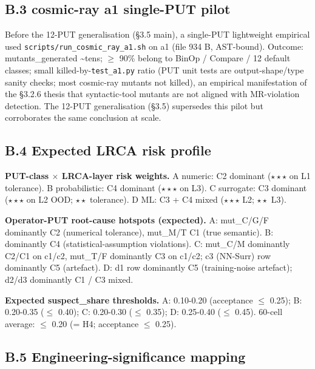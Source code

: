 \documentclass[manuscript,screen,review]{acmart}
\begin{document}
\subsection{B.3 cosmic-ray a1 single-PUT pilot}\label{b.3-cosmic-ray-a1-single-put-pilot-pre-12-put-empirical}

Before the 12-PUT generalisation (§3.5 main), a single-PUT lightweight
empirical used \texttt{scripts/run\_cosmic\_ray\_a1.sh} on a1 (file
934 B, AST-bound). Outcome: mutants\_generated \textasciitilde tens; $\geq$
90\% belong to BinOp / Compare / 12 default classes; small
killed-by-\texttt{test\_a1.py} ratio (PUT unit tests are
output-shape/type sanity checks; most cosmic-ray mutants not killed), an
empirical manifestation of the §3.2.6 thesis that syntactic-tool mutants
are not aligned with MR-violation detection. The 12-PUT generalisation
(§3.5) supersedes this pilot but corroborates the same conclusion at
scale.

\subsection{B.4 Expected LRCA risk profile}\label{b.4-expected-lrca-risk-profile}

\textbf{PUT-class $\times$ LRCA-layer risk weights.} A numeric: C2 dominant
($\star\star\star$ on L1 tolerance). B probabilistic: C4 dominant ($\star\star\star$ on L3). C
surrogate: C3 dominant ($\star\star\star$ on L2 OOD; $\star\star$ tolerance). D ML: C3 + C4
mixed ($\star\star\star$ L2; $\star\star$ L3).

\textbf{Operator-PUT root-cause hotspots (expected).} A: mut\_C/G/F
dominantly C2 (numerical tolerance), mut\_M/T C1 (true semantic). B:
dominantly C4 (statistical-assumption violations). C: mut\_C/M
dominantly C2/C1 on c1/c2, mut\_T/F dominantly C3 on c1/c2; c3 (NN-Surr)
row dominantly C5 (artefact). D: d1 row dominantly C5 (training-noise
artefact); d2/d3 dominantly C1 / C3 mixed.

\textbf{Expected suspect\_share thresholds.} A: 0.10-0.20 (acceptance $\leq$
0.25); B: 0.20-0.35 ($\leq$ 0.40); C: 0.20-0.30 ($\leq$ 0.35); D: 0.25-0.40 ($\leq$
0.45). 60-cell average: $\leq$ 0.20 (= H4; acceptance $\leq$ 0.25).

\subsection{B.5 Engineering-significance mapping}\label{b.5-engineering-significance-mapping}
\end{document}
